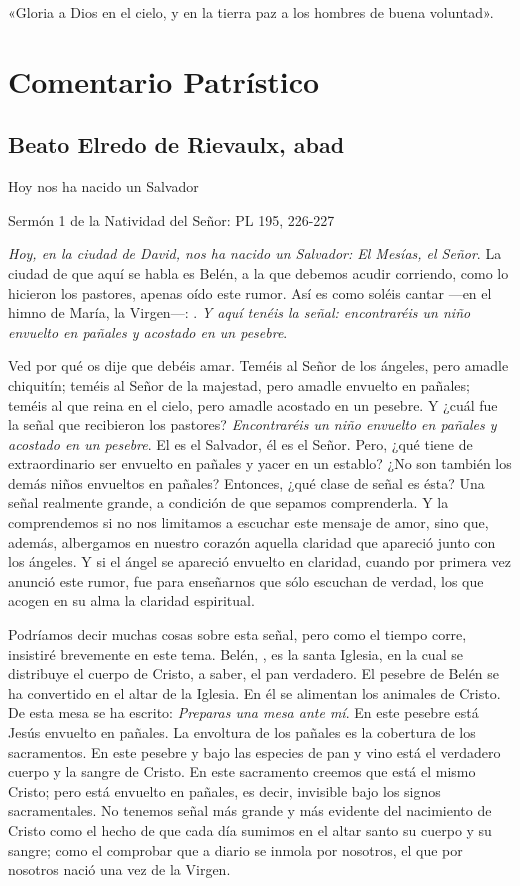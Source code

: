«Gloria a Dios en el cielo, y en la tierra paz a los hombres de buena
voluntad».



\section{Comentario Patrístico}

\subsection{Beato Elredo de Rievaulx, abad}

Hoy nos ha nacido un Salvador

Sermón 1 de la Natividad del Señor: PL 195, 226-227

\emph{Hoy, en la ciudad de David, nos ha nacido un Salvador: El Mesías, el Señor}. La ciudad de que aquí se habla es Belén, a la que debemos acudir corriendo, como lo hicieron los pastores, apenas oído este rumor. Así es como soléis cantar ---en el himno de María, la Virgen---: . \emph{Y aquí tenéis la señal: encontraréis un niño envuelto en pañales y acostado en un pesebre}.

Ved por qué os dije que debéis amar. Teméis al Señor de los ángeles, pero amadle chiquitín; teméis al Señor de la majestad, pero amadle envuelto en pañales; teméis al que reina en el cielo, pero amadle acostado en un pesebre. Y ¿cuál fue la señal que recibieron los pastores? \emph{Encontraréis un niño envuelto en pañales y acostado en un pesebre}. El es el Salvador, él es el Señor. Pero, ¿qué tiene de extraordinario ser envuelto en pañales y yacer en un establo? ¿No son también los demás niños envueltos en pañales? Entonces, ¿qué clase de señal es ésta? Una señal realmente grande, a condición de que sepamos comprenderla. Y la comprendemos si no nos limitamos a escuchar este mensaje de amor, sino que, además, albergamos en nuestro corazón aquella claridad que apareció junto con los ángeles. Y si el ángel se apareció envuelto en claridad, cuando por primera vez anunció este rumor, fue para enseñarnos que sólo escuchan de verdad, los que acogen en su alma la claridad espiritual.

Podríamos decir muchas cosas sobre esta señal, pero como el tiempo corre, insistiré brevemente en este tema. Belén, , es la santa Iglesia, en la cual se distribuye el cuerpo de Cristo, a saber, el pan verdadero. El pesebre de Belén se ha convertido en el altar de la Iglesia. En él se alimentan los animales de Cristo. De esta mesa se ha escrito: \emph{Preparas una mesa ante mí}. En este pesebre está Jesús envuelto en pañales. La envoltura de los pañales es la cobertura de los sacramentos. En este pesebre y bajo las especies de pan y vino está el verdadero cuerpo y la sangre de Cristo. En este sacramento creemos que está el mismo Cristo; pero está envuelto en pañales, es decir, invisible bajo los signos sacramentales. No tenemos señal más grande y más evidente del nacimiento de Cristo como el hecho de que cada día sumimos en el altar santo su cuerpo y su sangre; como el comprobar que a diario se inmola por nosotros, el que por nosotros nació una vez de la Virgen.

